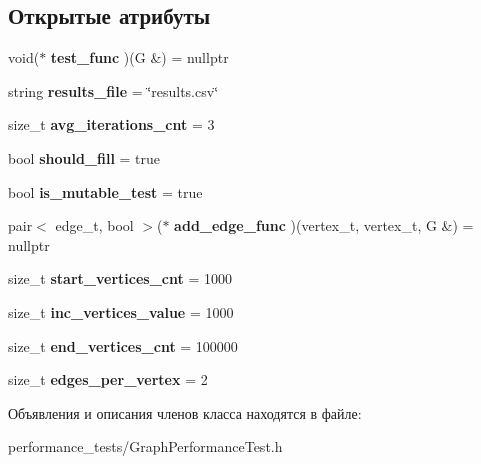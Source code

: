\subsection*{Открытые атрибуты}
\begin{DoxyCompactItemize}
\item 
\mbox{\label{class_graph_performance_test_a6a81e81b07a591860d0a1183ed05f023}} 
void($\ast$ {\bfseries test\+\_\+func} )(G \&) = nullptr
\item 
\mbox{\label{class_graph_performance_test_a29b8d1216b085d2e59b9373e57e8c215}} 
string {\bfseries results\+\_\+file} = \char`\"{}results.\+csv\char`\"{}
\item 
\mbox{\label{class_graph_performance_test_aea61a34b1ef7ae8c1c33361242c2c7c4}} 
size\+\_\+t {\bfseries avg\+\_\+iterations\+\_\+cnt} = 3
\item 
\mbox{\label{class_graph_performance_test_a76c584ed92d5cb9bfe5c7f454fb3d437}} 
bool {\bfseries should\+\_\+fill} = true
\item 
\mbox{\label{class_graph_performance_test_a827065a47360940a0f32c190ad66988b}} 
bool {\bfseries is\+\_\+mutable\+\_\+test} = true
\item 
\mbox{\label{class_graph_performance_test_a3a6c213cd32e751e1652c97397340bd7}} 
pair$<$ edge\+\_\+t, bool $>$($\ast$ {\bfseries add\+\_\+edge\+\_\+func} )(vertex\+\_\+t, vertex\+\_\+t, G \&) = nullptr
\item 
\mbox{\label{class_graph_performance_test_ad2d7566c76d0743fd89a6e74f5280100}} 
size\+\_\+t {\bfseries start\+\_\+vertices\+\_\+cnt} = 1000
\item 
\mbox{\label{class_graph_performance_test_a5335c67d0198d70412f02a0a14a38fa2}} 
size\+\_\+t {\bfseries inc\+\_\+vertices\+\_\+value} = 1000
\item 
\mbox{\label{class_graph_performance_test_a68c14062ddb3bfcbd7a9957fc3d211a2}} 
size\+\_\+t {\bfseries end\+\_\+vertices\+\_\+cnt} = 100000
\item 
\mbox{\label{class_graph_performance_test_af1ffbabe05d708b11769fdc3d0004dba}} 
size\+\_\+t {\bfseries edges\+\_\+per\+\_\+vertex} = 2
\end{DoxyCompactItemize}


Объявления и описания членов класса находятся в файле\+:\begin{DoxyCompactItemize}
\item 
performance\+\_\+tests/Graph\+Performance\+Test.\+h\end{DoxyCompactItemize}
